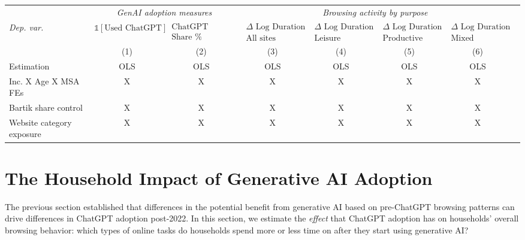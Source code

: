 \documentclass[12pt]{article}
\begin{document}
\begin{table}[htbp]
\begin{adjustbox}{max width=\textwidth}
\begin{tabular}{@{}l*{7}{c}@{}}
&  \multicolumn{2}{c}{\textit{GenAI adoption measures}} &  \multicolumn{4}{c}{\textit{Browsing activity by purpose}} \\
\cmidrule(lr){2-3} \cmidrule(lr){4-7} 
\textit{Dep. var.} &  $\mathbb{1}[\text{Used ChatGPT}]$  &   $\substack{\text{ChatGPT Duration} \\ \text{Share \%} }$  &  
$\substack{\Delta \text{ Log Duration} \\ \text{All sites}}$ & $\substack{\Delta \text{ Log Duration} \\ \text{Leisure}}$ &  $\substack{\Delta \text{ Log Duration} \\ \text{Productive}}$   &  $\substack{\Delta \text{ Log Duration} \\ \text{Mixed}}$   \\
   \cmidrule(lr){2-2}   \cmidrule(lr){3-3}   \cmidrule(lr){4-4}   \cmidrule(lr){5-5}   \cmidrule(lr){6-6}   \cmidrule(lr){7-7}  
 &  (1) & (2) & (3) & (4) & (5)  & (6) \\

\addlinespace
 	Estimation & OLS & OLS & OLS & OLS & OLS  & OLS   \\ 
Inc. X Age X MSA FEs     & X & X	& X & X	& X    & X     \\	
Bartik share control     & X & X	& X & X	 	& X  & X    \\	
Website category exposure    & X & X	& X & X	& X  & X    \\	
    \bottomrule
\end{tabular}
\end{adjustbox}
\end{table}





\section{The Household Impact of Generative AI Adoption} \label{sec:Impact}



The previous section established that differences in the potential benefit from generative AI based on pre-ChatGPT browsing patterns can drive differences in ChatGPT adoption post-2022. In this section, we estimate the \textit{effect} that ChatGPT adoption has on households' overall browsing behavior: which types of online tasks do households spend more or less time on after they start using generative AI?
\end{document}
